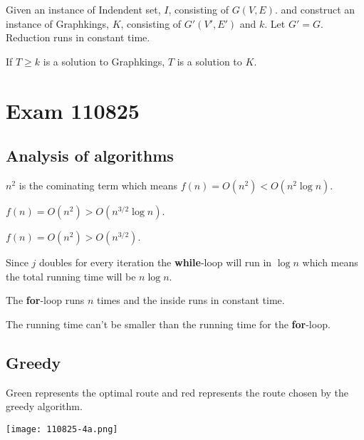 \documentclass[a4paper]{article}
\newenvironment{task}[1]
{
	\begin{description}[align=right]
		\item [#1]
}{		%
	\end{description}
}
\DeclareMathOperator{\*}{\cdot}
\begin{document}
\begin{task}{12. (f)}
	Given an instance of Indendent set, $I$, consisting of $G(V,E)$. and construct an instance of Graphkings, $K$, consisting of $G'(V',E')$ and $k$. Let $G'=G$. Reduction runs in constant time.
	
	If $T\geq k$ is a solution to Graphkings, $T$ is a solution to $K$.
\end{task}

\pagebreak
\section*{Exam 110825}
\subsection*{Analysis of algorithms}

\begin{task}{1. (a)}
	 $n^2$ is the cominating term which means $f(n)=O(n^2)<O(n^2\log n)$.
\end{task}

\begin{task}{(b)}
	 $f(n)=O(n^2)>O(n^{3/2}\log n)$.
\end{task}

\begin{task}{(c)}
	 $f(n)=O(n^2)>O(n^{3/2})$.
\end{task}

\begin{task}{2. (a)}
	 Since $j$ doubles for every iteration the \textbf{while}-loop will run in $\log n$ which means the total running time will be $n\log n$.
\end{task}

\begin{task}{3. (a)}
	 The \textbf{for}-loop runs $n$ times and the inside runs in constant time.
\end{task}

\begin{task}{(b)}
	 The running time can't be smaller than the running time for the \textbf{for}-loop.
\end{task}

\subsection*{Greedy}

\begin{task}{4. (a)}
	\qquad Green represents the optimal route and red represents the route chosen by the greedy algorithm.
	
	\texttt{[image: 110825-4a.png]}
\end{task}
\end{document}
